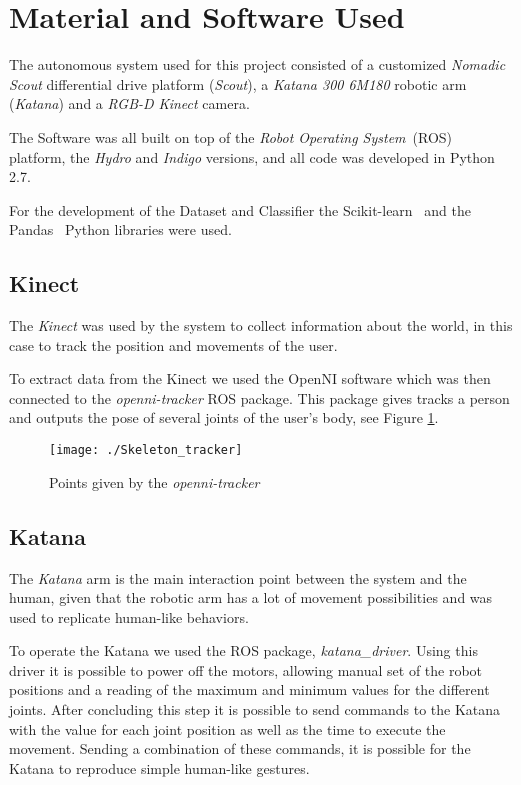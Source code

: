 
\section{Material and Software Used}
The autonomous system used for this project consisted of a customized \textit{Nomadic Scout} differential drive platform (\emph{Scout}), a  \textit{Katana 300 6M180} robotic arm (\textit{Katana}) and a \textit{RGB-D Kinect} camera.

The Software was all built on top of the \textit{Robot Operating System}~(ROS)~\cite{ROS} platform, the \textit{Hydro} and \textit{Indigo} versions, and all code was developed in Python 2.7.

For the development of the Dataset and Classifier the Scikit-learn~\cite{Scikit-Learn} and the Pandas~\cite{Pandas} Python libraries were used.	

\subsection{Kinect}
The \textit{Kinect} was used by the system to collect information about the world, in this case to track the position and movements of the user. 

To extract data from the Kinect we used the OpenNI software which was then connected to the  \textit{openni-tracker} ROS package. This package gives tracks a person and outputs the pose of several joints of the user's body, see Figure \ref{fig:skeleton_tracker}.

\begin{figure}[!h]
	\centering
		\texttt{[image: ./Skeleton\_tracker]}
	\caption{Points given by the \textit{openni-tracker}}\label{fig:skeleton_tracker}
\end{figure}

\subsection{Katana}\label{Material: Katana}
The \textit{Katana} arm is the main interaction point between the system and the human, given that the robotic arm has a lot of movement possibilities and was used to replicate human-like behaviors.

To operate the Katana we used the ROS package, \textit{katana\_driver}.  Using this driver it is possible to power off the motors, allowing manual set of the robot positions and a reading of the maximum and minimum values for the different joints. After concluding this step it is possible to send commands to the Katana with the value for each joint position as well as the time to execute the movement. Sending a combination of these commands, it is possible for the Katana to reproduce simple human-like gestures.

